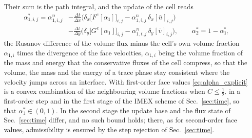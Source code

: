 Their sum is the path integral, and the update of the cell reads
\begin{equation}
\begin{aligned}
\alpha^*_{1,i,j}=\alpha^n_{1,i,j}&-\frac{\Delta t}{\Delta x}\Big(\delta_x\big[F^e[\alpha_1]\big]_{i,j}-\alpha^n_{1,i,j}\,\delta_x[\bar u]_{i,j}\Big)\\
&-\frac{\Delta t}{\Delta y}\Big(\delta_y\big[G^e[\alpha_1]\big]_{i,j}-\alpha^n_{1,i,j}\,\delta_y[\bar v]_{i,j}\Big),\qquad
\alpha^*_2=1-\alpha^*_1 ,
\end{aligned}
\label{eq:alpha_explicit}
\end{equation}
the Rusanov difference of the volume flux minus the cell's own volume fraction $\alpha_{1,i}$ times the divergence of the face
velocities, $\alpha_{1,i}$ being the volume fraction of the mass and energy that the conservative fluxes of the cell compress, so that the volume, the mass and the energy of a
trace phase stay consistent where the velocity jumps across an interface. With first-order face values \eqref{eq:alpha_explicit} is a convex combination of the neighbouring volume
fractions when $C\le\tfrac12$, in a first-order step and in the first stage of the IMEX scheme of Sec.~\ref{sec:time}, so that
$\alpha^*_1\in(0,1)$. In the second stage the update base and the flux state of Sec.~\ref{sec:time} differ, and no
such bound holds; there, as for second-order face values, admissibility is ensured by the step rejection of Sec.~\ref{sec:time}.

